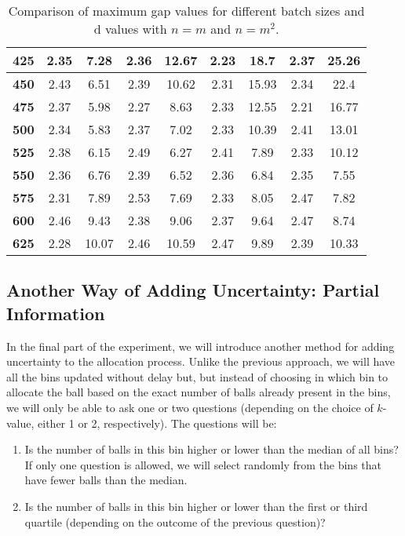 \documentclass[a4paper, 11pt]{article}
\begin{document}
\begin{table}[H]
\begin{tabular}{|c||cc|cc|cc|cc|}
        \textbf{425} & 2.35 & 7.28 & 2.36 & 12.67 & 2.23 & 18.7 & 2.37 & 25.26 \\ \hline
        \textbf{450} & 2.43 & 6.51 & 2.39 & 10.62 & 2.31 & 15.93 & 2.34 & 22.4 \\ \hline
        \textbf{475} & 2.37 & 5.98 & 2.27 & 8.63 & 2.33 & 12.55 & 2.21 & 16.77 \\ \hline
        \textbf{500} & 2.34 & 5.83 & 2.37 & 7.02 & 2.33 & 10.39 & 2.41 & 13.01 \\ \hline
        \textbf{525} & 2.38 & 6.15 & 2.49 & 6.27 & 2.41 & 7.89 & 2.33 & 10.12 \\ \hline
        \textbf{550} & 2.36 & 6.76 & 2.39 & 6.52 & 2.36 & 6.84 & 2.35 & 7.55 \\ \hline
        \textbf{575} & 2.31 & 7.89 & 2.53 & 7.69 & 2.33 & 8.05 & 2.47 & 7.82 \\ \hline
        \textbf{600} & 2.46 & 9.43 & 2.38 & 9.06 & 2.37 & 9.64 & 2.47 & 8.74 \\ \hline
        \textbf{625} & 2.28 & 10.07 & 2.46 & 10.59 & 2.47 & 9.89 & 2.39 & 10.33 \\ \hline
    \end{tabular}
    \caption{Comparison of maximum gap values for different batch sizes and d values with $n = m$ and $n = m^2$.}
    \label{tab:comparison-batched-d}
\end{table}


\subsection{Another Way of Adding Uncertainty: Partial Information}
 In the final part of the experiment, we will introduce another method for adding uncertainty to the allocation process. Unlike the previous approach, we will have all the bins updated without delay but, but instead of choosing in which bin to allocate the ball based on the exact number of balls already present in the bins, we will only be able to ask one or two questions (depending on the choice of $k$-value, either 1 or 2, respectively). The questions will be:
\begin{enumerate} 
    \item Is the number of balls in this bin higher or lower than the median of all bins? If only one question is allowed, we will select randomly from the bins that have fewer balls than the median. 
    \item Is the number of balls in this bin higher or lower than the first or third quartile (depending on the outcome of the previous question)? 
\end{enumerate}
\end{document}
